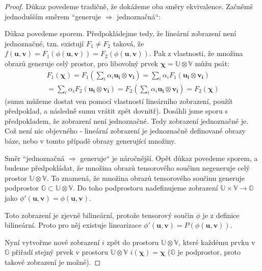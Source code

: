 \documentclass[a5paper,12pt]{amsbook}
\theoremstyle{definition}
\newcommand{\myvec}[1]{\mathbf{#1}}
\newcommand{\myspace}[1]{\mathbb{#1}}
\begin{document}
\begin{proof}
Důkaz povedeme tradičně, že dokážeme oba směry ekvivalence. Začněmš jednodušším směrem
``generuje $\Rightarrow$ jednoznačná``:

\medskip\noindent
Důkaz povedeme sporem. Předpokládejme tedy, že lineární zobrazení není jednoznačné,
tzn. existují $F_1 \neq F_2$ taková, že
$f(\myvec{u}, \myvec{v}) = F_1(\phi(\myvec{u}, \myvec{v})) = F_2(\phi(\myvec{u}, \myvec{v}))$.
Pak z vlastnosti, že množina obrazů generuje celý prostor, pro libovolný prvek $\myvec{\chi} = \myspace{U}\otimes\myspace{V}$ můžu psát:
\begin{equation*}
\begin{split}
F_1(\myvec{\chi}) = F_1(\sum_{i}\alpha_i\myvec{u_i}\otimes\myvec{v_i})
= \sum_{i}\alpha_i F_1(\myvec{u_i}\otimes\myvec{v_i}) \\
= \sum_{i}\alpha_i F_2(\myvec{u_i}\otimes\myvec{v_i})
= F_2(\sum_{i}\alpha_i\myvec{u_i}\otimes\myvec{v_i}) = F_2(\myvec{\chi})
\end{split}
\end{equation*}
(sumu můžeme dostat ven pomocí vlastností lineárního zobrazení, použít předpoklad, a následně
sumu vrátit zpět dovnitř). Dosáhli jsme sporu s předpokladem, že zobrazení není jednoznačné.
Tedy zobrazení jednoznačné je. Což není nic objevného - lineární zobrazení je jednoznačně
definované obrazy báze, nebo v tomto případě obrazy generující množiny.

\medskip\noindent
Směr ``jednoznačná $\Rightarrow$ generuje`` je náročnější. Opět důkaz povedeme sporem, a budeme
předpokládat, že množina obrazů tensorového součinu negeneruje celý prostor
$\myspace{U}\otimes\myspace{V}$. To znamená, že množina obrazů tensorového součinu generuje
podprostor $\myspace{G}\subset\myspace{U}\otimes\myspace{V}$. Do toho podprostoru nadefinujeme
zobrazení $\myspace{U}\times\myspace{V}\rightarrow\myspace{G}$ jako
$\phi'(\myvec{u}, \myvec{v}) = \phi(\myvec{u}, \myvec{v})$.
\begin{center}

\end{center}
Toto zobrazení je zjevně bilineární, protože tensorový součin $\phi$ je z definice bilineární.
Proto pro něj existuje linearizace $\phi'(\myvec{u}, \myvec{v}) = P(\phi(\myvec{u}, \myvec{v}))$.

Nyní vytvořme nové zobrazení $i$ zpět do prostoru $\myspace{U}\otimes\myspace{V}$, které každému
prvku v $\myspace{G}$ přiřadí stejný prvek v prostoru $\myspace{U}\otimes\myspace{V}$
$i(\myvec{\chi}) = \myvec{\chi}$ ($\myspace{G}$ je podprostor, proto takové zobrazení je možné).


\end{proof}
\end{document}
